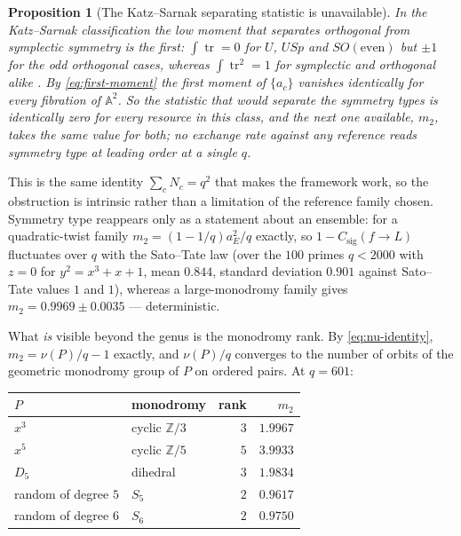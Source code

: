 \documentclass[11pt]{article}
\theoremstyle{definition}
\theoremstyle{plain}
\newtheorem{proposition}[definition]{Proposition}
\theoremstyle{remark}
\newcommand{\csig}{C_{\mathrm{sig}}}
\begin{document}
\begin{proposition}[The Katz--Sarnak separating statistic is unavailable]
\label{prop:symmetry}
In the Katz--Sarnak classification the low moment that separates orthogonal from
symplectic symmetry is the first: \(\int\operatorname{tr}=0\) for \(U\), \(USp\)
and \(SO(\text{even})\) but \(\pm1\) for the odd orthogonal cases, whereas
\(\int\operatorname{tr}^2=1\) for symplectic and orthogonal alike
\cite{katz-sarnak}.  By \eqref{eq:first-moment} the first moment of \(\{a_c\}\)
vanishes identically for every fibration of \(\mathbb A^2\).  So the statistic
that would separate the symmetry types is identically zero for every resource in
this class, and the next one available, \(m_2\), takes the same value for both;
no exchange rate against any reference reads symmetry type at leading order at a
single \(q\).
\end{proposition}

This is the same identity \(\sum_cN_c=q^2\) that makes the framework work, so
the obstruction is intrinsic rather than a limitation of the reference family
chosen.  Symmetry type reappears only as a statement about
an ensemble: for a quadratic-twist family \(m_2=(1-1/q)a_E^2/q\) exactly, so
\(1-\csig(f\to L)\) fluctuates over \(q\) with the Sato--Tate law (over the
\(100\) primes \(q<2000\) with \(z=0\) for \(y^2=x^3+x+1\), mean \(0.844\),
standard deviation \(0.901\) against Sato--Tate values \(1\) and \(1\)), whereas
a large-monodromy family gives \(m_2=0.9969\pm0.0035\) --- deterministic.

What \emph{is} visible beyond the genus is the monodromy rank.  By
\eqref{eq:nu-identity}, \(m_2=\nu(P)/q-1\) exactly, and \(\nu(P)/q\) converges
to the number of orbits of the geometric monodromy group of \(P\) on ordered
pairs.  At \(q=601\):

\begin{center}
\begin{tabular}{@{}llrr@{}}
\toprule
\(P\) & monodromy & rank & \(m_2\)\\
\midrule
\(x^3\) & cyclic \(\mathbb Z/3\) & \(3\) & \(1.9967\)\\
\(x^5\) & cyclic \(\mathbb Z/5\) & \(5\) & \(3.9933\)\\
\(D_5\) & dihedral & \(3\) & \(1.9834\)\\
random of degree \(5\) & \(S_5\) & \(2\) & \(0.9617\)\\
random of degree \(6\) & \(S_6\) & \(2\) & \(0.9750\)\\
\bottomrule
\end{tabular}
\end{center}
\end{document}

